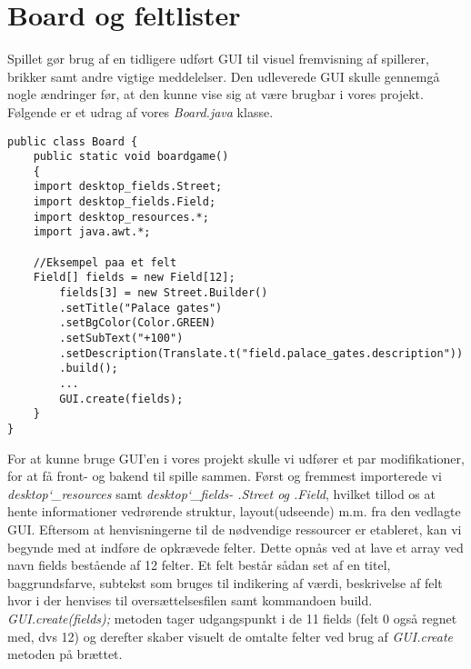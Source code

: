 \section{Board og feltlister}
\noindent Spillet gør brug af en tidligere udført GUI til visuel fremvisning af spillerer, brikker samt andre vigtige meddelelser. 
Den udleverede GUI skulle gennemgå nogle ændringer før, at den kunne vise sig at være brugbar i vores projekt. 
Følgende er et udrag af vores \textit{Board.java} klasse.\\
\begin{lstlisting}
public class Board {
    public static void boardgame()
    {
    import desktop_fields.Street;
    import desktop_fields.Field;
    import desktop_resources.*;
    import java.awt.*;
        
    //Eksempel paa et felt
    Field[] fields = new Field[12];
        fields[3] = new Street.Builder()
        .setTitle("Palace gates")
        .setBgColor(Color.GREEN)
        .setSubText("+100")
        .setDescription(Translate.t("field.palace_gates.description"))
        .build();
        ...
        GUI.create(fields);
    }
}        
\end{lstlisting}
\vspace{2ex}

\noindent For at kunne bruge GUI'en i vores projekt skulle vi udfører et par modifikationer, for at få front- og bakend til spille sammen. 
Først og fremmest importerede vi \textit{desktop\char`_resources} samt \textit{desktop\char`_fields- .Street og .Field}, hvilket tillod os at hente informationer vedrørende struktur, layout(udseende) m.m. fra den vedlagte GUI. 
Eftersom at henvisningerne til de nødvendige ressourcer er etableret, kan vi begynde med at indføre de opkrævede felter. 
Dette opnås ved at lave et array ved navn fields bestående af 12 felter. 
Et felt består sådan set af en titel, baggrundsfarve, subtekst som bruges til indikering af værdi, beskrivelse af felt hvor i der henvises til oversættelsesfilen samt kommandoen build. 
\textit{GUI.create(fields);} metoden tager udgangspunkt i de 11 fields (felt 0 også regnet med, dvs 12) og derefter skaber visuelt de omtalte felter ved brug af \textit{GUI.create} metoden på brættet.\\

